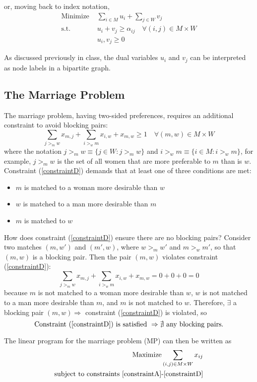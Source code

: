 \documentclass[twoside]{article}
\begin{document}
or, moving back to index notation,
\begin{align*}
    \text{Minimize } &\sum_{i\in M}u_i + \sum_{j\in W}v_j\\
    \text{s.t. }&u_i + v_j \geq \alpha_{ij} \quad \forall (i,j) \in M \times W\\
    & u_i, v_j \geq 0
\end{align*}

As discussed previously in class, the dual variables $u_i$ and $v_j$ can be interpreted as node labels in a bipartite graph.

\subsection{The Marriage Problem}

The marriage problem, having two-sided preferences, requires an additional constraint to avoid blocking pairs:
\[
\sum_{j >_m w}x_{m,j} + \sum_{i >_w m}x_{i,w} + x_{m,w} \geq 1 \quad \forall (m,w) \in M \times W \tag{D} \label{constraintD}
\]
where the notation $j >_m w \equiv \lbrace j \in W : j >_m w \rbrace$ and $i >_w m \equiv \lbrace i \in M : i >_w m \rbrace$, for example, $j >_m w$ is the set of all women that are more preferable to $m$ than is $w$. Constraint (\ref{constraintD}) demands that at least one of three conditions are met:
\begin{itemize}
    \item $m$ is matched to a woman more desirable than $w$
    \item $w$ is matched to a man more desirable than $m$
    \item $m$ is matched to $w$
\end{itemize}

How does constraint (\ref{constraintD}) ensure there are no blocking pairs? Consider two matches $(m,w')$ and $(m',w)$, where $w >_m w'$ and $m >_w m'$, so that $(m,w)$ is a blocking pair. Then the pair $(m,w)$ violates constraint (\ref{constraintD}):
\[
\sum_{j >_m w}x_{m,j} + \sum_{i >_w m}x_{i,w} + x_{m,w} = 0+0+0=0
\]
because $m$ is not matched to a woman more desirable than $w$, $w$ is not matched to a man more desirable than $m$, and $m$ is not matched to $w$. Therefore, $\exists$ a blocking pair $(m,w) \Rightarrow$ constraint (\ref{constraintD}) is violated, so
\[
\text{Constraint (\ref{constraintD}) is satisfied } \Rightarrow \nexists \text{ any blocking pairs}.
\]

The linear program for the marriage problem (MP) can then be written as 
\begin{align*}
\text{Maximize} \sum_{(i,j)\in M \times W} x_{ij}\\
\text{subject to constraints \ref{constraintA}-\ref{constraintD}}
\end{align*}
\end{document}
